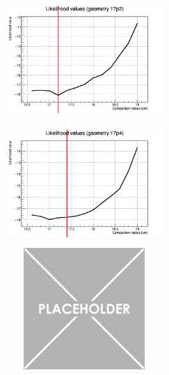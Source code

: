 \documentclass[a4paper, 11pt]{report}
\begin{document}
\begin{figure}[htbp]
\begin{minipage}[b]{.32\textwidth}
\includegraphics[width=6cm, height=4.6cm]{figs/likelihood250LowStat/likelihood17p2.png}
\end{minipage}\hfill
\begin{minipage}[b]{.32\textwidth}
\includegraphics[width=6cm, height=4.6cm]{figs/likelihood250LowStat/likelihood17p4.png}
\end{minipage} \hfill
\begin{minipage}[b]{.32\textwidth}
\includegraphics[width=6cm, height=4.6cm]{figs/placeholder.png}
\end{minipage} \hfill \vspace{10pt}


\end{figure}
\end{document}
